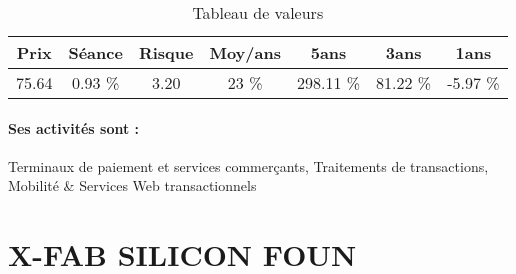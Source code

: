\documentclass[11pt,a4paper]{report}%
\begin{document}
\begin{table}[H]
  \centering
    \begin{tabular}{|c|c|c|c|c|c|c|}
    \hline
    Prix & Séance & Risque  & Moy/ans & 5ans & 3ans & 1ans \\
    \hline
    75.64 &    0.93 \%    & 3.20 & 23 \% & 298.11 \% & 81.22 \% & -5.97 \% \\
    \hline
    \end{tabular}%
        \label{tab:table_WORLDLINE}%
      \caption{Tableau de valeurs}
\end{table}%

\paragraph{Ses activités sont : } Terminaux de paiement et services commerçants, Traitements de transactions, Mobilité \& Services Web transactionnels  
    
    \newpage

\section{X-FAB SILICON FOUN}
\end{document}
